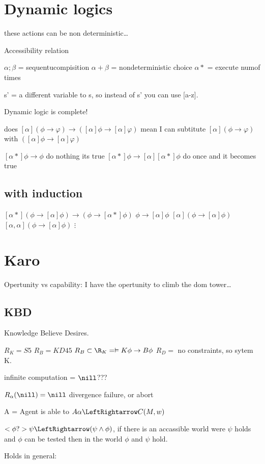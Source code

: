 \documentclass{article}
\begin{document}
\section{Dynamic logics}
these actions can be non deterministic\ldots

Accessibility relation

$\alpha;\beta$ = sequentu\alphal compisition
$\alpha+\beta$ = nondeterministic choice
$\alpha*$ = execute \alphar\betaitr\alphary num\betaer of times

s' = a different variable to s, so instead of s' you can use [a-z].

Dynamic logic is complete!

does $[\alpha] ( \phi \to \varphi) \to ([\alpha] \phi \to [\alpha] \varphi)$
mean I can subtitute  $[\alpha] ( \phi \to \varphi)$ with
$([\alpha] \phi \to [\alpha] \varphi)$

$[\alpha*]\phi\to\phi$ do nothing its true
$[\alpha*]\phi\to[\alpha][\alpha*]\phi$ do once and it becomes true
\subsection{with induction}
$[\alpha*](\phi \to [\alpha]\phi)\to(\phi\to[\alpha*]\phi)$ 
$\phi\to[\alpha]\phi$
$[\alpha](\phi\to[\alpha]\phi)$
$[\alpha, \alpha](\phi\to[\alpha]\phi)$
$\vdots$

\section{Karo}
Opertunity vs capability: I have the opertunity to climb the dom tower\ldots

\subsection{KBD}
Knowledge Believe Desires.

$R_K = S5$
$R_B = KD45$
$R_B \subset \R_K = \vDash K\phi \to B\phi$
$R_D =$ no constraints, so sytem K.

infinite computation = $\nill$???

$R_\alpha(\nill)=\nill$ {divergence failure, or abort}

A = Agent is able to
$A\alpha \LeftRightarrow C(M,w)$

$<\phi?>\psi \LeftRightarrow (\psi \wedge \phi)$, if there is an accassible world
were $\psi$ holds and $\phi$ can be tested then in the world $\phi$ and $\psi$ hold.

Holds in general:
\end{document}
